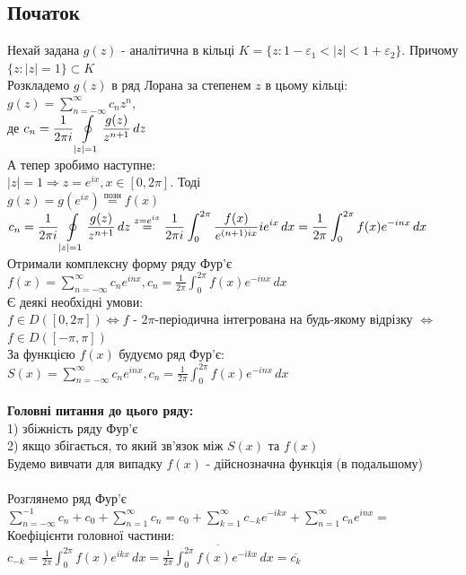 \documentclass[a4paper, 14pt]{extarticle}
\def\hugespace{\vspace{5mm} \\}
\begin{document}
\subsection{Початок}
Нехай задана $g(z)$ - аналітична в кільці $K = \{z: 1-\varepsilon_1 <|z|<1+\varepsilon_2 \}$. Причому $\{z: |z|=1\} \subset K$\\
Розкладемо $g(z)$ в ряд Лорана за степенем $z$ в цьому кільці:\\
$\displaystyle g(z) = \sum_{n=-\infty}^{\infty} c_n z^n$,\\
де $\displaystyle c_n = \frac{1}{2 \pi i} \oint\displaylimits_{|z|=1} \frac{g(z)}{z^{n+1}}\,dz$\\
А тепер зробимо наступне:\\
$|z|=1 \Rightarrow z = e^{ix}, x \in [0, 2 \pi]$. Тоді\\
$\displaystyle g(z) = g(e^{ix}) \overset{\textrm{позн}}{=} f(x)$\\
$\displaystyle c_n = \frac{1}{2 \pi i} \oint\displaylimits_{|z|=1} \frac{g(z)}{z^{n+1}}\,dz \overset{z=e^{ix}}{=}  \frac{1}{2 \pi i} \int_0^{2 \pi} \frac{f(x)}{e^{(n+1)ix}} ie^{ix}\,dx = \frac{1}{2 \pi} \int_0^{2 \pi} f(x)e^{-inx}\,dx$\\
Отримали комплексну форму ряду Фур'є\\
$\displaystyle f(x) = \sum_{n=-\infty}^{\infty} c_n e^{inx}, c_n = \frac{1}{2 \pi} \int_0^{2 \pi} f(x)e^{-inx}\,dx$
\hugespace
Є деякі необхідні умови:\\
$f \in D([0, 2\pi]) \iff f$ - $2 \pi$-періодична інтегрована на будь-якому відрізку $\iff$ $f \in D([-\pi, \pi])$\\
За функцією $f(x)$ будуємо ряд Фур'є:\\
$\displaystyle S(x) = \sum_{n=-\infty}^{\infty} c_n e^{inx}, c_n = \frac{1}{2 \pi} \int_0^{2 \pi} f(x)e^{-inx}\,dx$\\
\hugespace
\textbf{Головні питання до цього ряду:}\\
1) збіжність ряду Фур'є\\
2) якщо збігається, то який зв'язок між $S(x)$ та $f(x)$\\
Будемо вивчати для випадку $f(x)$ - дійснозначна функція (в подальшому)\\
\hugespace
Розглянемо ряд Фур'є\\
$\displaystyle \sum_{n=-\infty}^{-1} c_n + c_0 + \displaystyle \sum_{n=1}^{\infty} c_n
= c_0 + \displaystyle \sum_{k=1}^{\infty} c_{-k}e^{-ikx} + \sum_{n=1}^{\infty} c_ne^{inx} \boxed{=}
$\\
Коефіцієнти головної частини: \\ $\displaystyle c_{-k} = \frac{1}{2 \pi} \int_0^{2\pi} f(x)e^{ikx} \,dx = \overline{\frac{1}{2 \pi} \int_0^{2\pi} f(x)e^{-ikx} \,dx} = \overline{c_k}$\\
\end{document}
